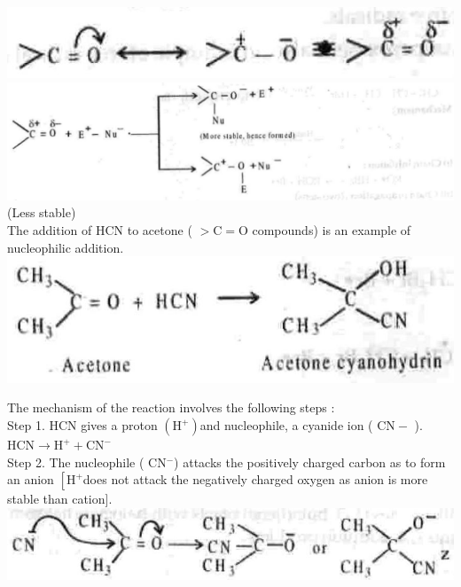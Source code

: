 \documentclass[10pt]{article}
\begin{document}
\includegraphics[max width=\textwidth, center]{2025_01_28_8470952b98110cec3aabg-097(1)}\\
\includegraphics[max width=\textwidth, center]{2025_01_28_8470952b98110cec3aabg-097(3)}\\
(Less stable)\\
The addition of HCN to acetone ( $>\mathrm{C}=\mathrm{O}$ compounds) is an example of nucleophilic addition.\\
\includegraphics[max width=\textwidth, center]{2025_01_28_8470952b98110cec3aabg-097}

The mechanism of the reaction involves the following steps :\\
Step 1. HCN gives a proton $\left(\mathrm{H}^{+}\right)$and nucleophile, a cyanide ion ( $\mathrm{CN}-$ ).\\
$\mathrm{HCN} \longrightarrow \mathrm{H}^{+}+\mathrm{CN}^{-}$\\
Step 2. The nucleophile ( $\mathrm{CN}{ }^{-}$) attacks the positively charged carbon as to form an anion $\left[\mathrm{H}^{+}\right.$does not attack the negatively charged oxygen as anion is more stable than cation].\\
\includegraphics[max width=\textwidth, center]{2025_01_28_8470952b98110cec3aabg-098(5)}
\end{document}
